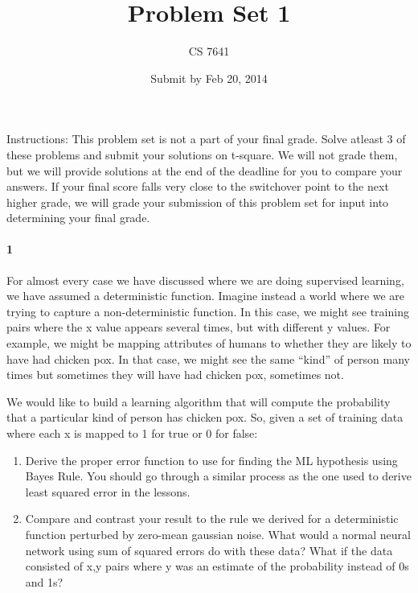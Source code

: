 \documentclass[10pt,letter]{article}
\begin{document}
\title{Problem Set 1}
\author{CS 7641}
\date{Submit by Feb 20, 2014}
\maketitle

Instructions: This problem set is not a part of your final grade. Solve atleast 3 of these problems and submit your solutions on t-square. We will not grade them, but we will provide solutions at the end of the deadline for you to compare your answers. If your final score falls very close to the switchover point to the next higher grade, we will grade your submission of this problem set for input into determining your final grade.

\paragraph{1} 

For almost every case we have discussed where we are doing supervised learning, we have assumed a deterministic function. Imagine instead a world where we are trying to capture a non-deterministic function. In this case, we might see training pairs where the x value appears several times, but with different y values. For example, we might be mapping attributes of humans to whether they are likely to have had chicken pox. In that case, we might see the same “kind” of person many times but sometimes they will have had chicken pox, sometimes not.

We would like to build a learning algorithm that will compute the probability that a particular kind of person has chicken pox. So, given a set of training data where each x is mapped to 1 for true or 0 for false:

\begin{enumerate}
	\item Derive the proper error function to use for finding the ML hypothesis using Bayes Rule. You should go through a similar process as the one used to derive least squared error in the lessons.

	\item Compare and contrast your result to the rule we derived for a deterministic function perturbed by zero-mean gaussian noise. What would a normal neural network using sum of squared errors do with these data?  What if the data consisted of x,y pairs where y was an estimate of the probability instead of 0s and 1s?
\end{enumerate}
\end{document}
